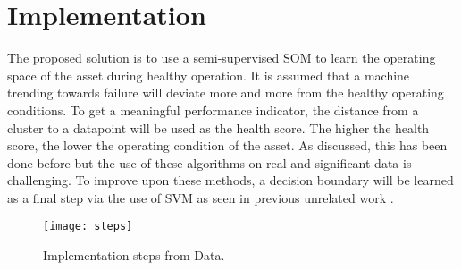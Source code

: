 \section{Implementation}

The proposed solution is to use a semi-supervised SOM to learn the operating space of the asset during healthy operation. 
It is assumed that a machine trending towards failure will deviate more and more from the healthy operating conditions.
To get a meaningful performance indicator, the distance from a cluster to a datapoint will be used as the health score.
The higher the health score, the lower the operating condition of the asset.
As discussed, this has been done before but the use of these algorithms on real and significant data is challenging.
To improve upon these methods, a decision boundary will be learned as a final step via the use of SVM as seen in previous unrelated work \cite{opt}.

\begin{figure}[!h]
    \texttt{[image: steps]}
    \centering
    \label{fig:steps}
    \caption{Implementation steps from Data.}
\end{figure}